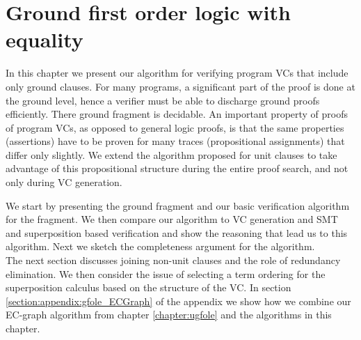 \chapter{Ground first order logic with equality}\label{chapter:gfole}

In this chapter we present our algorithm for verifying program VCs that include only ground clauses.
For many programs, a significant part of the proof is done at the ground level, hence a verifier must be able to discharge ground proofs efficiently. There ground fragment is decidable. An important property of proofs of program VCs, as opposed to general logic proofs, is that the same properties (assertions) have to be proven for many traces (propositional assignments) that differ only slightly. We extend the algorithm proposed for unit clauses to take advantage of this propositional structure during the entire proof search, and not only during VC generation.

We start by presenting the ground fragment and our basic verification algorithm for the fragment.
We then compare our algorithm to VC generation and SMT and superposition based verification and show the reasoning that lead us to this algorithm. Next we sketch the completeness argument for the algorithm.\\
The next section discusses joining non-unit clauses and the role of redundancy elimination.
We then consider the issue of selecting a term ordering for the superposition calculus based on the structure of the VC.
In section \ref{section:appendix:gfole_ECGraph} of the appendix we show how we combine our EC-graph algorithm from chapter \ref{chapter:ugfole} and the algorithms in this chapter.




%


